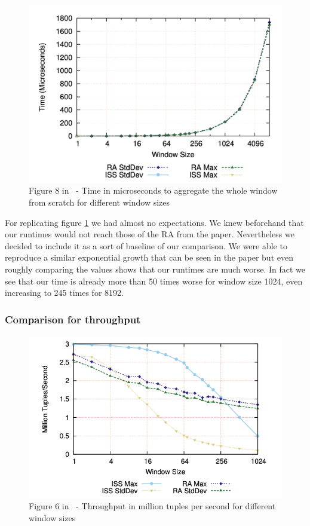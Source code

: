 \begin{figure}[H]
	\centering
	\includegraphics[width=\linewidth]{../figures/fig8}
	\caption{Figure 8 in~\cite{GeneralIncremental15} - Time in microseconds to aggregate the whole window from scratch for different window sizes}
	\label{fig:fig8Orig}
\end{figure}

For replicating figure \ref{fig:fig8Orig} we had almost no expectations. We knew beforehand that
our runtimes would not reach those of the RA from the paper. Nevertheless we decided
to include it as a sort of baseline of our comparison. We were able to reproduce a similar
exponential growth that can be seen in the paper but even roughly comparing the
values shows that our runtimes are much worse. In fact we see that our time is already
more than 50 times worse for window size 1024, even increasing to 245 times for 8192.

\subsubsection{Comparison for throughput}



\begin{figure}[H]
	\centering
	\includegraphics[width=\linewidth]{../figures/fig6}
	\caption{Figure 6 in~\cite{GeneralIncremental15} - Throughput in million tuples per second for different window sizes}
	\label{fig:fig6Orig}
\end{figure}

